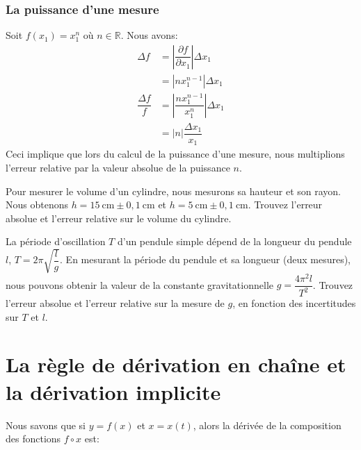 \documentclass[]{book}
\theoremstyle{definition}
\theoremstyle{definition}
\theoremstyle{definition}
\theoremstyle{remark}
\let\BeginKnitrBlock\begin \let\EndKnitrBlock\end
\begin{document}
\hypertarget{la-puissance-dune-mesure}{%
\subsubsection{La puissance d'une
mesure}\label{la-puissance-dune-mesure}}

Soit \(f(x_1)=x_1^n\) où \(n\in\mathbb{R}\). Nous avons: \begin{align*}
\Delta f &= \left| \dfrac{\partial f}{\partial x_1} \right| \Delta x_1 \\
&= |nx_1^{n-1}| \Delta x_1 \\
\dfrac{\Delta f}{f} &= \left| \dfrac{nx_1^{n-1}}{x_1^n} \right| \Delta x_1 \\
&= |n| \dfrac{\Delta x_1}{x_1}
\end{align*} Ceci implique que lors du calcul de la puissance d'une
mesure, nous multiplions l'erreur relative par la valeur absolue de la
puissance \(n\).

\BeginKnitrBlock{example}
\protect\hypertarget{exm:unnamed-chunk-177}{}{\label{exm:unnamed-chunk-177}
}Pour mesurer le volume d'un cylindre, nous mesurons sa hauteur et son
rayon. Nous obtenons \(h=15\ \text{cm}\pm 0,1\ \text{cm}\) et
\(h=5\ \text{cm}\pm 0,1\ \text{cm}\). Trouvez l'erreur absolue et
l'erreur relative sur le volume du cylindre.
\EndKnitrBlock{example}
\vspace*{8cm}

\BeginKnitrBlock{example}
\protect\hypertarget{exm:unnamed-chunk-178}{}{\label{exm:unnamed-chunk-178}
}La période d'oscillation \(T\) d'un pendule simple dépend de la
longueur du pendule \(l\), \(T=2\pi\sqrt{\dfrac{l}{g}}\). En mesurant la
période du pendule et sa longueur (deux mesures), nous pouvons obtenir
la valeur de la constante gravitationnelle \(g=\dfrac{4\pi^2 l}{T^2}\).
Trouvez l'erreur absolue et l'erreur relative sur la mesure de \(g\), en
fonction des incertitudes sur \(T\) et \(l\).
\EndKnitrBlock{example}
\vspace*{8cm}

\hypertarget{la-regle-de-derivation-en-chaine-et-la-derivation-implicite}{%
\section{La règle de dérivation en chaîne et la dérivation
implicite}\label{la-regle-de-derivation-en-chaine-et-la-derivation-implicite}}

Nous savons que si \(y=f(x)\) et \(x=x(t)\), alors la dérivée de la
composition des fonctions \(f\circ x\) est:
\end{document}
